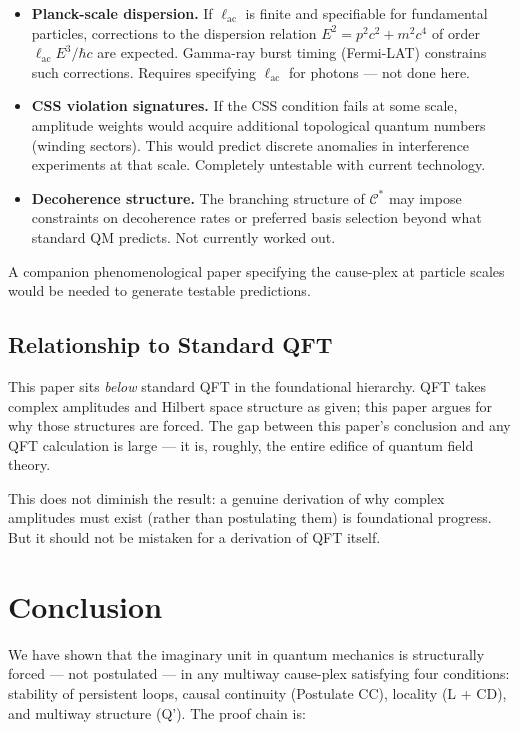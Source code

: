 \documentclass[11pt]{article}
\theoremstyle{definition}
\theoremstyle{remark}
\begin{document}
\begin{itemize}
\item
  \textbf{Planck-scale dispersion.} If \(\ell_{\mathrm{ac}}\) is finite
  and specifiable for fundamental particles, corrections to the
  dispersion relation \(E^2 = p^2c^2 + m^2c^4\) of order
  \(\ell_{\mathrm{ac}} E^3/\hbar c\) are expected. Gamma-ray burst
  timing (Fermi-LAT) constrains such corrections. Requires specifying
  \(\ell_{\mathrm{ac}}\) for photons --- not done here.
\item
  \textbf{CSS violation signatures.} If the CSS condition fails at some
  scale, amplitude weights would acquire additional topological quantum
  numbers (winding sectors). This would predict discrete anomalies in
  interference experiments at that scale. Completely untestable with
  current technology.
\item
  \textbf{Decoherence structure.} The branching structure of
  \(\mathcal{C}^{\ast}\) may impose constraints on decoherence rates or
  preferred basis selection beyond what standard QM predicts. Not
  currently worked out.
\end{itemize}

A companion phenomenological paper specifying the cause-plex at particle
scales would be needed to generate testable predictions.

\subsection{Relationship to Standard
QFT}\label{relationship-to-standard-qft}

This paper sits \emph{below} standard QFT in the foundational hierarchy.
QFT takes complex amplitudes and Hilbert space structure as given; this
paper argues for why those structures are forced. The gap between this
paper's conclusion and any QFT calculation is large --- it is, roughly,
the entire edifice of quantum field theory.

This does not diminish the result: a genuine derivation of why complex
amplitudes must exist (rather than postulating them) is foundational
progress. But it should not be mistaken for a derivation of QFT itself.

\medskip

\section{Conclusion}\label{conclusion}

We have shown that the imaginary unit in quantum mechanics is
structurally forced --- not postulated --- in any multiway cause-plex
satisfying four conditions: stability of persistent loops, causal
continuity (Postulate CC), locality (L + CD), and multiway structure
(Q'). The proof chain is:
\end{document}
